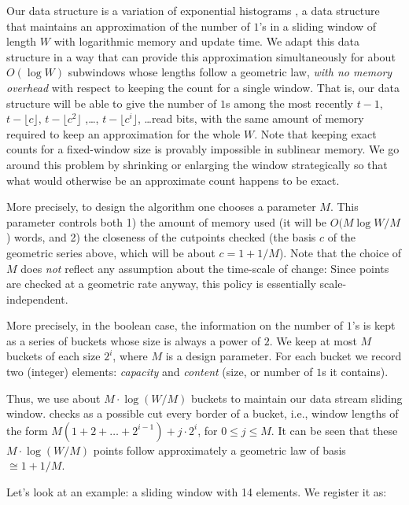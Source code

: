 Our data structure is a variation of exponential histograms \cite{datar02},
a data structure that maintains an approximation of the number of
$1$'s in a sliding window of length $W$ with logarithmic memory 
and update time. 
We adapt this data structure in a way that can provide this approximation
simultaneously for about $O(\log W)$ subwindows 
whose lengths follow a geometric law, {\em with no memory overhead}
with respect to keeping the count for a single window. 
That is, our data structure will be able to give 
the number of $1$s among the most recently $t-1$, $t-\lfloor c\rfloor$, 
$t-\lfloor c^2\rfloor$ ,\dots, $t-\lfloor c^i\rfloor$, \dots read bits, 
with the same amount of memory required to keep an approximation 
for the whole $W$. Note that keeping exact counts for a fixed-window
size is provably impossible in sublinear memory. 
We go around this problem by shrinking or enlarging the window strategically 
so that what would otherwise be an approximate count happens to be exact. 

More precisely, to design the algorithm one chooses a parameter $M$. 
This parameter controls both 
1) the amount of memory used (it will be $O(M \log W/M$) words, and 2)
the closeness of the cutpoints checked (the basis $c$ 
of the geometric series above, which will be about $c=1+1/M$).
Note that the choice of $M$ does {\em not} reflect 
any assumption about the time-scale of change: Since points
are checked at a geometric rate anyway, this policy is essentially
scale-independent. 

More precisely, in the boolean case, the information on the number of $1$'s 
is kept as a series of buckets whose size is always a power of $2$. We keep 
at most $M$ buckets of each size $2^i$, where $M$ is a design parameter. 
For each bucket we record two (integer) elements: {\em capacity} and {\em content }(size, 
or number of $1$s it contains). 

Thus, we use about $M \cdot \log (W/M)$ buckets to maintain our data stream sliding window.
\adwintwo checks as a possible cut every border of a bucket, i.e., 
window lengths of the form $M (1+2+\dots+2^{i-1})+ j \cdot 2^i$, 
for $0 \le j \le M$. It can be seen that these $M \cdot \log (W/M)$ 
points follow approximately a geometric law of basis $\cong 1+1/M$. 

Let's look at an example: a sliding window with 14 elements. We register it as:

\medskip
\hspace{10pt}      
\smallskip


